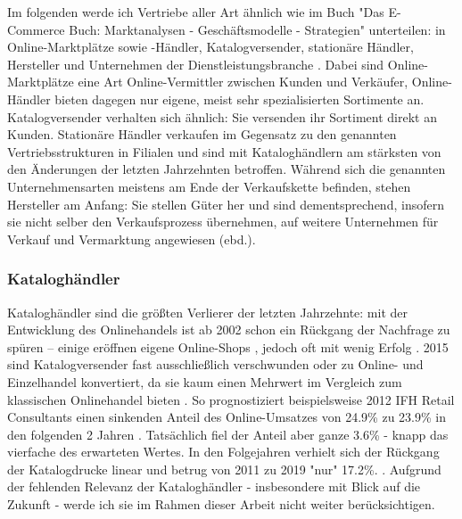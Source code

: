 \begin{folding} %

Im folgenden werde ich Vertriebe aller Art ähnlich wie im Buch "Das E-Commerce Buch: Marktanalysen - Geschäftsmodelle - Strategien" unterteilen: in Online-Marktplätze sowie -Händler, Katalogversender, stationäre Händler, Hersteller und Unternehmen der Dienstleistungsbranche \cite[S. 15ff]{Graf}. Dabei sind Online-Marktplätze eine Art Online-Vermittler zwischen Kunden und Verkäufer, Online-Händler bieten dagegen nur eigene, meist sehr spezialisierten Sortimente an. Katalogversender verhalten sich ähnlich: Sie versenden ihr Sortiment direkt an Kunden. Stationäre Händler verkaufen im Gegensatz zu den genannten Vertriebsstrukturen in Filialen und sind mit Kataloghändlern am stärksten von den Änderungen der letzten Jahrzehnten betroffen. Während sich die genannten Unternehmensarten meistens am Ende der Verkaufskette befinden, stehen Hersteller am Anfang: Sie stellen Güter her und sind dementsprechend, insofern sie nicht selber den Verkaufsprozess übernehmen, auf weitere Unternehmen für Verkauf und Vermarktung angewiesen (ebd.). %

\end{folding}

\begin{folding} \subsubsection{Kataloghändler}

Kataloghändler sind die größten Verlierer der letzten Jahrzehnte: mit der Entwicklung des Onlinehandels ist ab 2002 schon ein Rückgang der Nachfrage zu spüren – einige eröffnen eigene Online-Shops \cite[S. 24f]{Graf}, jedoch oft mit wenig Erfolg \cite[S. 38]{Graf}. 2015 sind Katalogversender fast ausschließlich verschwunden oder zu Online- und Einzelhandel konvertiert, da sie kaum einen Mehrwert im Vergleich zum klassischen Onlinehandel bieten \cite[S. 47]{Graf}. So prognostiziert beispielsweise 2012 IFH Retail Consultants einen sinkenden Anteil des Online-Umsatzes von 24.9\% zu 23.9\% in den folgenden 2 Jahren \cite[S. 20]{evilcom}. Tatsächlich fiel der Anteil aber ganze 3.6\% - knapp das vierfache des erwarteten Wertes. In den Folgejahren verhielt sich der Rückgang der Katalogdrucke linear und betrug von 2011 zu 2019 "nur" 17.2\%. \cite{statista-katalog}. Aufgrund der fehlenden Relevanz der Kataloghändler - insbesondere mit Blick auf die Zukunft - werde ich sie im Rahmen dieser Arbeit nicht weiter berücksichtigen. 

\end{folding}

